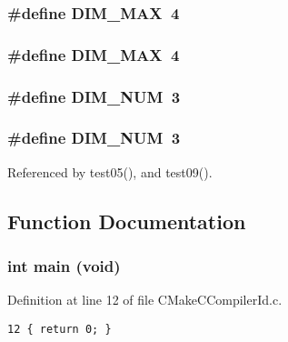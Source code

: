 \subsubsection{\setlength{\rightskip}{0pt plus 5cm}\#define DIM\_\-MAX~4}\label{sobol__prb_8C_4bf6f11165a23227af11f1d0d75798a4}


\subsubsection{\setlength{\rightskip}{0pt plus 5cm}\#define DIM\_\-MAX~4}\label{sobol__prb_8C_4bf6f11165a23227af11f1d0d75798a4}


\subsubsection{\setlength{\rightskip}{0pt plus 5cm}\#define DIM\_\-NUM~3}\label{sobol__prb_8C_7e02749e4493cd5d2665d3d959fa1c84}


\subsubsection{\setlength{\rightskip}{0pt plus 5cm}\#define DIM\_\-NUM~3}\label{sobol__prb_8C_7e02749e4493cd5d2665d3d959fa1c84}




Referenced by test05(), and test09().

\subsection{Function Documentation}
\subsubsection{\setlength{\rightskip}{0pt plus 5cm}int main (void)}\label{sobol__prb_8C_840291bc02cba5474a4cb46a9b9566fe}




Definition at line 12 of file CMakeCCompilerId.c.

\begin{Code}\begin{verbatim}12 { return 0; }
\end{verbatim}
\end{Code}


